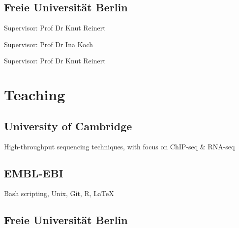 \documentclass{klmr-cv}
\begin{document}
\subsection{Freie Universität Berlin}

\date{2010--2011}
\item{}
\item{Supervisor: Prof Dr Knut Reinert}

\date{2009}
\item{}
\item{Supervisor: Prof Dr Ina Koch}

\date{2008}
\item{}
\item{Supervisor: Prof Dr Knut Reinert}

\section{Teaching}

\subsection{University of Cambridge}

\date{2017}
\item{}
\date{2017}
\item{}
\date{2013--2015}
\item{}
\item{High-throughput sequencing techniques, with focus on ChIP-seq \& RNA-seq}

\subsection{EMBL-EBI}

\date{2011--2015}
\item{}
\item{Bash scripting, Unix, Git, R, \LaTeX}

\subsection{Freie Universität Berlin}
\end{document}
